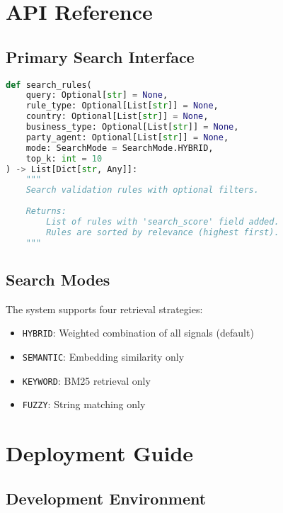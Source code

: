 \section{API Reference}
\label{sec:app-api}

\subsection{Primary Search Interface}

\begin{lstlisting}[language=Python, caption={Search API specification}, label={lst:search-api}]
def search_rules(
    query: Optional[str] = None,
    rule_type: Optional[List[str]] = None,
    country: Optional[List[str]] = None,
    business_type: Optional[List[str]] = None,
    party_agent: Optional[List[str]] = None,
    mode: SearchMode = SearchMode.HYBRID,
    top_k: int = 10
) -> List[Dict[str, Any]]:
    """
    Search validation rules with optional filters.
    
    Returns:
        List of rules with 'search_score' field added.
        Rules are sorted by relevance (highest first).
    """
\end{lstlisting}

\subsection{Search Modes}

The system supports four retrieval strategies:

\begin{itemize}[leftmargin=*,itemsep=2pt,topsep=2pt]
  \item \texttt{HYBRID}: Weighted combination of all signals (default)
  \item \texttt{SEMANTIC}: Embedding similarity only
  \item \texttt{KEYWORD}: BM25 retrieval only  
  \item \texttt{FUZZY}: String matching only
\end{itemize}

\section{Deployment Guide}
\label{sec:app-deployment}

\subsection{Development Environment}

